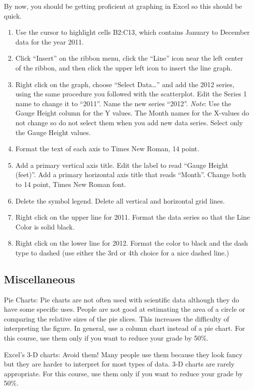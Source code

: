 \documentclass[11pt]{article}
\begin{document}
By now, you should be getting proficient at graphing in Excel so this should be quick.

\begin{enumerate}
	\item Use the cursor to highlight cells B2:C13, which contains January to December data for the year 2011.

	\item Click “Insert” on the ribbon menu, click the “Line” icon near the left center of the ribbon, and then click the upper left icon to insert the line graph.

	\item Right click on the graph, choose “Select Data…” and add the 2012 series, using the same procedure you followed with the scatterplot. Edit the Series 1 name to change it to “2011”. Name the new series “2012”. \emph{Note}: Use the Gauge Height column for the Y values. The Month names for the X-values do not change so do not select them when you add new data series. Select only the Gauge Height values.

	\item Format the text of each axis to Times New Roman, 14 point.
	
	\item Add a primary vertical axis title. Edit the label to read “Gauge Height (feet)”. Add a primary horizontal axis title that reads “Month”. Change both to 14 point, Times New Roman font.

	\item Delete the symbol legend. Delete all vertical and horizontal grid lines.

	\item Right click on the upper line for 2011. Format the data series so that the Line Color is solid black.

	\item Right click on the lower line for 2012. Format the color to black and the dash type to dashed (use either the 3rd or 4th choice for a nice dashed line.)
\end{enumerate}

\subsection*{Miscellaneous}

Pie Charts: Pie charts are not often used with scientific data although they do have some specific uses. People are not good at estimating the area of a circle or comparing the relative sizes of the pie slices. This increases the difficulty of interpreting the figure. In general, use a column chart instead of a pie chart. For this course, use them only if you want to reduce your grade by 50\%.

Excel’s 3-D charts: Avoid them! Many people use them because they look fancy but they are harder to interpret for most types of data. 3-D charts are rarely appropriate. For this course, use them only if you want to reduce your grade by 50\%.
\end{document}
